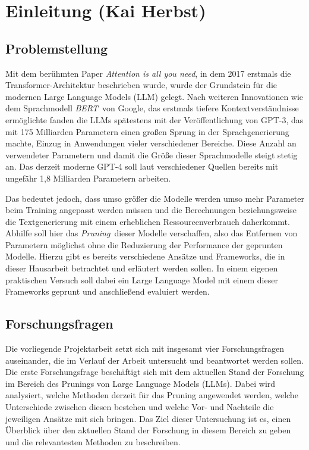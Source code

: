 \section{Einleitung (Kai Herbst)}

\subsection{Problemstellung}

Mit dem berühmten Paper \emph{Attention is all you need}, in dem 2017 erstmals
die Transformer-Architektur beschrieben wurde, wurde der Grundstein für die
modernen Large Language Models (LLM) gelegt.
\autocite[Vgl.][]{vaswani2017attention} Nach weiteren Innovationen wie dem
Sprachmodell \emph{BERT} von Google, das erstmals tiefere Kontextverständnisse
ermöglichte\autocite[Vgl.][]{bertgoogle} fanden die LLMs spätestens mit der
Veröffentlichung von GPT-3, das mit 175 Milliarden Parametern einen großen
Sprung in der Sprachgenerierung machte, Einzug in Anwendungen vieler
verschiedener Bereiche.\autocite[Vgl.][]{gpt3} Diese Anzahl an verwendeter
Parametern und damit die Größe dieser Sprachmodelle steigt stetig an. Das
derzeit moderne GPT-4 soll laut verschiedener Quellen bereits mit ungefähr 1,8
Milliarden Parametern arbeiten.\autocite[Vgl.][]{gpt4size}

Das bedeutet jedoch, dass umso größer die Modelle werden umso mehr Parameter
beim Training angepasst werden müssen und die Berechnungen beziehungsweise die
Textgenerierung mit einem erheblichen Ressourcenverbrauch daherkommt. Abhilfe
soll hier das \emph{Pruning} dieser Modelle verschaffen, also das Entfernen von
Parametern möglichst ohne die Reduzierung der Performance der geprunten
Modelle.\autocite[Vgl.][]{llmpruner} Hierzu gibt es bereits verschiedene Ansätze
und Frameworks, die in dieser Hausarbeit betrachtet und erläutert werden sollen.
In einem eigenen praktischen Versuch soll dabei ein Large Language Model mit
einem dieser Frameworks geprunt und anschließend evaluiert werden.

\subsection{Forschungsfragen}

Die vorliegende Projektarbeit setzt sich mit insgesamt vier Forschungsfragen
auseinander, die im Verlauf der Arbeit untersucht und beantwortet werden sollen.
Die erste Forschungsfrage beschäftigt sich mit dem aktuellen Stand der Forschung
im Bereich des Prunings von Large Language Models (LLMs). Dabei wird analysiert,
welche Methoden derzeit für das Pruning angewendet werden, welche Unterschiede
zwischen diesen bestehen und welche Vor- und Nachteile die jeweiligen Ansätze
mit sich bringen. Das Ziel dieser Untersuchung ist es, einen Überblick über den
aktuellen Stand der Forschung in diesem Bereich zu geben und die relevantesten
Methoden zu beschreiben.

